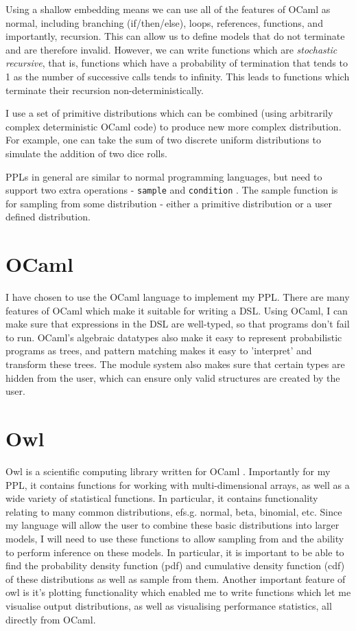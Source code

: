 Using a shallow embedding means we can use all of the features of OCaml as normal, including branching (if/then/else), loops, references, functions, and importantly, recursion. This can allow us to define models that do not terminate and are therefore invalid. However, we can write functions which are \textit{stochastic recursive}, that is, functions which have a probability of termination that tends to 1 as the number of successive calls tends to infinity. This leads to functions which terminate their recursion non-deterministically.

I use a set of primitive distributions which can be combined (using arbitrarily complex deterministic OCaml code) to produce new more complex distribution. For example, one can take the sum of two discrete uniform distributions to simulate the addition of two dice rolls. 

PPLs in general are similar to normal programming languages, but need to support two extra operations - \texttt{sample} and \texttt{condition} \cite{}. The sample function is for sampling from some distribution - either a primitive distribution or a user defined distribution.

\section{OCaml}
I have chosen to use the OCaml language to implement my PPL. There are many features of OCaml which make it suitable for writing a DSL. Using OCaml, I can make sure that expressions in the DSL are well-typed, so that programs don't fail to run. OCaml's algebraic datatypes also make it easy to represent probabilistic programs as trees, and pattern matching makes it easy to 'interpret' and transform these trees. The module system also makes sure that certain types are hidden from the user, which can ensure only valid structures are created by the user.

\section{Owl}

Owl is a scientific computing library written for OCaml \cite{owl}. Importantly for my PPL, it contains functions for working with multi-dimensional arrays, as well as a wide variety of statistical functions. In particular, it contains functionality relating to many common distributions, efs.g. normal, beta, binomial, etc. Since my language will allow the user to combine these basic distributions into larger models, I will need to use these functions to allow sampling from and the ability to perform inference on these models. In particular, it is important to be able to find the probability density function (pdf) and cumulative density function (cdf) of these distributions as well as sample from them. Another important feature of owl is it's plotting functionality which enabled me to write functions which let me visualise output distributions, as well as visualising performance statistics, all directly from OCaml.

